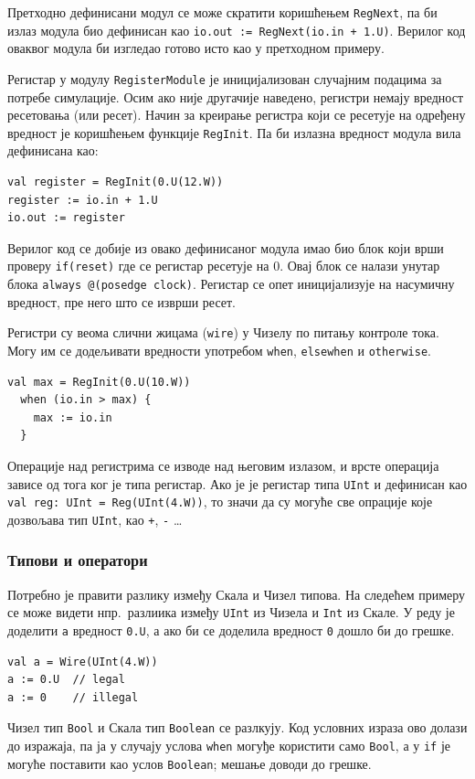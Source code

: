 \documentclass[12pt, a4paper]{article}
\theoremstyle{definition}
\begin{document}
Претходно дефинисани модул се може скратити коришћењем \verb+RegNext+, па би излаз модула био дефинисан као \verb-io.out := RegNext(io.in + 1.U)-. Верилог код оваквог модула би изгледао готово исто као у претходном примеру.

Регистар у модулу \verb+RegisterModule+ је иницијализован случајним подацима за потребе симулације. Осим ако није другачије наведено, регистри немају вредност ресетовања (или ресет). Начин за креирање регистра који се ресетује на одређену вредност је коришћењем функције \verb+RegInit+. Па би излазна вредност модула вила дефинисана као:
\begin{verbatim}
val register = RegInit(0.U(12.W))
register := io.in + 1.U
io.out := register
\end{verbatim}
Верилог код се добије из овако дефинисаног модула имао био блок који врши проверу \verb+if(reset)+ где се регистар ресетује на 0. Овај блок се налази унутар блока \verb+always @(posedge clock)+. Регистар се опет иницијализује на насумичну вредност, пре него што се изврши ресет.

Регистри су веома слични жицама (\verb+wire+) у Чизелу по питању контроле тока. Могу им се додељивати вредности употребом \verb+when+, \verb+elsewhen+ и \verb+otherwise+.

\begin{verbatim}
val max = RegInit(0.U(10.W))
  when (io.in > max) {
    max := io.in
  }
\end{verbatim}

Операције над регистрима се изводе над његовим излазом, и врсте операција зависе од тога ког је типа регистар. Ако је је регистар типа \verb+UInt+ и дефинисан као \verb+val reg: UInt = Reg(UInt(4.W))+, то значи да су могуће све опрације које дозвољава тип \verb+UInt+, као \verb-+-, \verb+-+ \dots

\subsubsection{Типови и оператори}
Потребно је правити разлику између Скала и Чизел типова. На следећем примеру се може видети нпр.\ разлиика између \verb+UInt+ из Чизела и \verb+Int+ из Скале. У реду је доделити \verb+a+ вредност \verb+0.U+, а ако би се доделила вредност \verb+0+ дошло би до грешке.
\begin{verbatim}
val a = Wire(UInt(4.W))
a := 0.U  // legal
a := 0    // illegal
\end{verbatim}

Чизел тип \verb+Bool+ и Скала тип \verb+Boolean+ се разлкују. Код условних израза ово долази до изражаја, па ја у случају услова \verb+when+ могуђе користити само \verb+Bool+, а у \verb+if+ је могуће поставити као услов \verb+Boolean+; мешање доводи до грешке.
\end{document}
